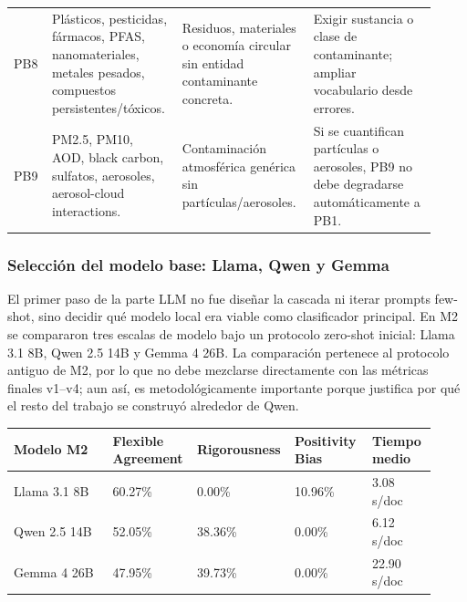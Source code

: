 \begin{center}
\begin{tabular}{p{0.08\linewidth}p{0.27\linewidth}p{0.28\linewidth}p{0.29\linewidth}}
PB8 & Plásticos, pesticidas, fármacos, PFAS, nanomateriales, metales pesados, compuestos persistentes/tóxicos. & Residuos, materiales o economía circular sin entidad contaminante concreta. & Exigir sustancia o clase de contaminante; ampliar vocabulario desde errores. \\
PB9 & PM2.5, PM10, AOD, black carbon, sulfatos, aerosoles, aerosol-cloud interactions. & Contaminación atmosférica genérica sin partículas/aerosoles. & Si se cuantifican partículas o aerosoles, PB9 no debe degradarse automáticamente a PB1. \\
\bottomrule
\end{tabular}
\end{center}

\subsubsection*{Selección del modelo base: Llama, Qwen y Gemma}

El primer paso de la parte LLM no fue diseñar la cascada ni iterar prompts few-shot, sino decidir qué modelo local era viable como clasificador principal. En M2 se compararon tres escalas de modelo bajo un protocolo zero-shot inicial: Llama 3.1 8B, Qwen 2.5 14B y Gemma 4 26B. La comparación pertenece al protocolo antiguo de M2, por lo que no debe mezclarse directamente con las métricas finales v1--v4; aun así, es metodológicamente importante porque justifica por qué el resto del trabajo se construyó alrededor de Qwen.

\begin{center}
\scriptsize
\setlength{\tabcolsep}{5pt}
\renewcommand{\arraystretch}{1.15}
\begin{tabular}{p{0.23\linewidth}p{0.18\linewidth}p{0.18\linewidth}p{0.18\linewidth}p{0.15\linewidth}}
\toprule
Modelo M2 & Flexible Agreement & Rigorousness & Positivity Bias & Tiempo medio \\
\midrule
Llama 3.1 8B & 60.27\% & 0.00\% & 10.96\% & 3.08 s/doc \\
Qwen 2.5 14B & 52.05\% & 38.36\% & 0.00\% & 6.12 s/doc \\
Gemma 4 26B & 47.95\% & 39.73\% & 0.00\% & 22.90 s/doc \\
\bottomrule
\end{tabular}
\end{center}

